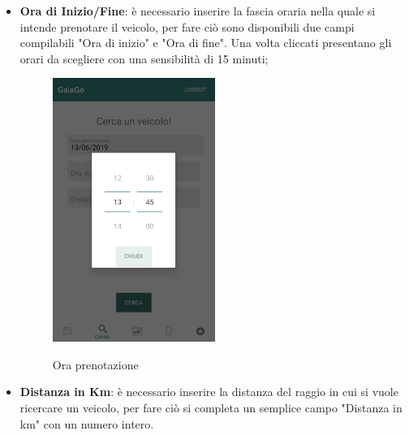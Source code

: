 \begin{itemize}
 \item \textbf{Ora di Inizio/Fine}: è necessario inserire la fascia oraria nella quale si intende prenotare il veicolo, per fare ciò sono disponibili due campi compilabili "Ora di inizio" e "Ora di fine". Una volta cliccati presentano gli orari da scegliere con una sensibilità di 15 minuti;
  \begin{figure}[H] 
 	\centering 
 	\includegraphics[width=0.5\textwidth]{res/images/ora_inizio.png}\\
 	\caption{Ora prenotazione}
 	\label{ora}
 \end{figure}
 
 \item \textbf{Distanza in Km}: è necessario inserire la distanza del raggio in cui si vuole ricercare un veicolo, per fare ciò si completa un semplice campo "Distanza in km" con un numero intero.
\end{itemize}
\pagebreak

